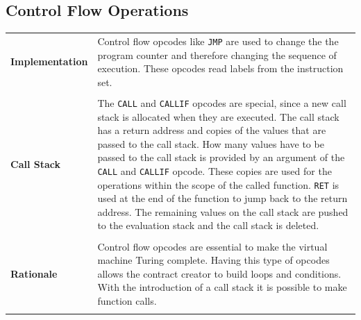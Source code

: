 \subsection{Control Flow Operations}
\begin{tabular}[t]{ p{3cm} p{12.5cm}}
\raggedright
\textbf{Implementation} &
Control flow opcodes like \texttt{JMP} are used to change the  the program counter and therefore changing the sequence of execution. These opcodes read labels from the instruction set. \\ \\

\textbf{Call Stack} &
The \texttt{CALL} and \texttt{CALLIF} opcodes are special, since a new call stack is allocated when they are executed. The call stack has a return address and copies of the values that are passed to the call stack. How many values have to be passed to the call stack is provided by an argument of the \texttt{CALL} and \texttt{CALLIF} opcode. These copies are used for the operations within the scope of the called function. \texttt{RET} is used at the end of the function to jump back to the return address. The remaining values on the call stack are pushed to the evaluation stack and the call stack is deleted. \\ \\

\raggedright
\textbf{Rationale} &
Control flow opcodes are essential to make the virtual machine Turing complete. Having this type of opcodes allows the contract creator to build loops and conditions. With the introduction of a call stack it is possible to make function calls. \\ \\
\end{tabular}

